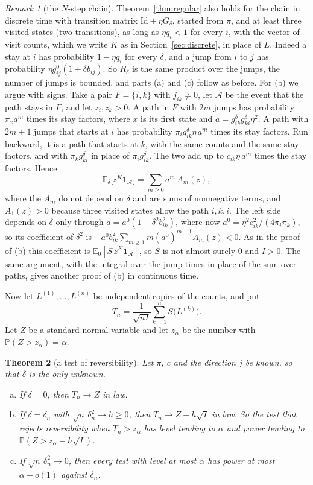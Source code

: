 \documentclass[11pt]{article}
\newtheorem{theorem}{Theorem}[section]
\theoremstyle{definition}
\theoremstyle{remark}
\newtheorem{remark}[theorem]{Remark}
\newcommand{\E}{\mathbb E}
\newcommand{\Prob}{\mathbb P}
\newcommand{\one}{\mathbf 1}
\begin{document}
\begin{remark}[the $N$-step chain]\label{rem:nstep}
Theorem~\ref{thm:regular} also holds for the chain in discrete time with
transition matrix $\mathrm{Id}+\eta G_\delta$, started from $\pi$, and at least
three visited states (two transitions), as long as $\eta q_i<1$ for
every $i$, with the vector of visit counts, which we write $K$ as in
Section~\ref{sec:discrete}, in place of $L$. Indeed a stay
at $i$ has probability $1-\eta q_i$ for every $\delta$, and a jump from $i$ to $j$
has probability $\eta g^0_{ij}(1+\delta b_{ij})$. So $R_\delta$ is the same product
over the jumps, the number of jumps is bounded, and parts (a) and (c) follow as
before. For (b) we argue with signs. Take a pair $F=\{i,k\}$ with $j_{ik}\ne0$,
let $\mathcal A$ be the event that the path stays in $F$, and let $z_i,z_k>0$.
A path in $F$ with $2m$ jumps has probability $\pi_x a^m$ times its stay
factors, where $x$ is its first state and $a=g^\delta_{ik}g^\delta_{ki}\eta^2$. A
path with $2m+1$ jumps that starts at $i$ has probability
$\pi_ig^\delta_{ik}\eta\,a^m$ times its stay factors. Run backward, it is a path
that starts at $k$, with the same counts and the same stay factors, and with
$\pi_kg^\delta_{ki}$ in place of $\pi_ig^\delta_{ik}$. The two add up to
$c_{ik}\eta\,a^m$ times the stay factors. Hence
\[
 \E_\delta\bigl[z^K\one_{\mathcal A}\bigr]=\sum_{m\ge0}a^m\,A_m(z),
\]
where the $A_m$ do not depend on $\delta$ and are sums of nonnegative terms, and
$A_1(z)>0$ because three visited states allow the path $i,k,i$. The left side depends on
$\delta$ only through $a=a^0(1-\delta^2b_{ik}^2)$, where now
$a^0=\eta^2c_{ik}^2/(4\pi_i\pi_k)$, so its coefficient of
$\delta^2$ is $-a^0b_{ik}^2\sum_{m\ge1}m(a^0)^{m-1}A_m(z)<0$. As in the proof
of (b) this coefficient is $\E_0[S\,z^K\one_{\mathcal A}]$, so $S$ is not
almost surely $0$ and $I>0$. The same argument, with the integral over the jump
times in place of the sum over paths, gives another proof of (b) in continuous
time.
\end{remark}

Now let $L^{(1)},\ldots,L^{(n)}$ be independent copies of the counts, and put
\[
 T_n=\frac1{\sqrt{nI}}\sum_{k=1}^nS\bigl(L^{(k)}\bigr).
\]
Let $Z$ be a standard normal variable and let $z_\alpha$ be the number with
$\Prob(Z>z_\alpha)=\alpha$.

\begin{theorem}[a test of reversibility]\label{thm:test}
Let $\pi$, $c$ and the direction $j$ be known, so that $\delta$ is the only
unknown.
\begin{enumerate}[(a),itemsep=1pt]
\item If $\delta=0$, then $T_n\to Z$ in law.
\item If $\delta=\delta_n$ with $\sqrt n\,\delta_n^2\to h\ge0$, then
 $T_n\to Z+h\sqrt I$ in law. So the test that rejects reversibility when
 $T_n>z_\alpha$ has level tending to $\alpha$ and power tending to
 $\Prob(Z>z_\alpha-h\sqrt I)$.
\item If $\sqrt n\,\delta_n^2\to0$, then every test with level at most
 $\alpha$ has power at most $\alpha+o(1)$ against $\delta_n$.
\end{enumerate}
\end{theorem}
\end{document}
